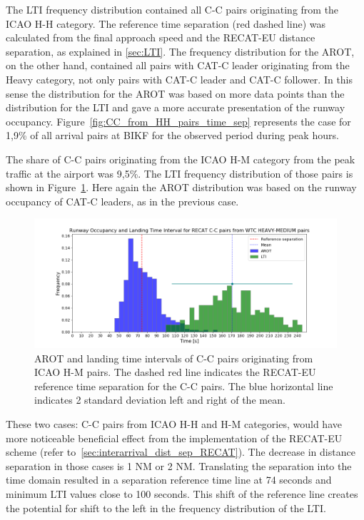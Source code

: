 The LTI frequency distribution contained all C-C pairs originating from the ICAO H-H category. The reference time separation (red dashed line) was calculated from the final approach speed and the RECAT-EU distance separation, as explained in \ref{sec:LTI}. The frequency distribution for the AROT, on the other hand, contained all pairs with CAT-C leader originating from the Heavy category, not only pairs with CAT-C leader and CAT-C follower. In this sense the distribution for the AROT was based on more data points than the distribution for the LTI and gave a more accurate presentation of the runway occupancy. Figure~\ref{fig:CC_from_HH_pairs_time_sep} represents the case for 1,9\% of all arrival pairs at BIKF for the observed period during peak hours.

The share of C-C pairs originating from the ICAO H-M category from the peak traffic at the airport was 9,5\%.  The LTI frequency distribution of those pairs is shown in Figure~\ref{fig:CC_from_HM_pairs_time_sep}. Here again the AROT distribution was based on the runway occupancy of CAT-C leaders, as in the previous case. 
 
\begin{figure}[h]
    \centering
    \includegraphics[width=1\textwidth]{graphics/fig_CC_from_HM_pairs_time_sep.png}
    \caption[AROT and LTI of C-C pairs originating from ICAO H-M pairs]{AROT and landing time intervals of C-C pairs originating from ICAO H-M pairs. The dashed red line indicates the RECAT-EU reference time separation for the C-C pairs. The blue horizontal line indicates 2 standard deviation left and right of the mean.}
    \label{fig:CC_from_HM_pairs_time_sep}
\end{figure}

These two cases: C-C pairs from ICAO H-H and H-M categories, would have more noticeable beneficial effect from the implementation of the RECAT-EU scheme (refer to~\ref{sec:interarrival_dist_sep_RECAT}). The decrease in distance separation in those cases is 1 NM or 2 NM. Translating the separation into the time domain resulted in a separation reference time line at 74 seconds and minimum LTI values close to 100 seconds. This shift of the reference line creates the potential for shift to the left in the frequency distribution of the LTI.
 

